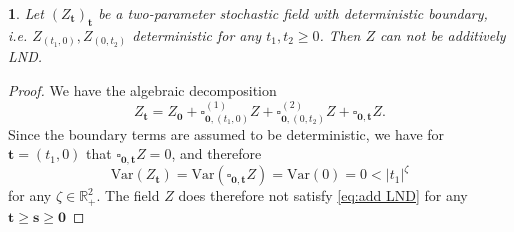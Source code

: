 \documentclass[11pt,oneside,english,reqno]{amsart}
\numberwithin{equation}{section}
\numberwithin{figure}{section}
\theoremstyle{plain}
\theoremstyle{definition}
\theoremstyle{remark}
\theoremstyle{plain}
\newtheorem{lem}[thm]{\protect\lemmaname}
\theoremstyle{plain}
\theoremstyle{plain}
\theoremstyle{plain}
\theoremstyle{plain}
\providecommand{\lemmaname}{Lemma}
\newcommand{\RR}{\mathbb{R}}
\newcommand{\boo}{\mathbf{0}}
\newcommand{\bs}{\mathbf{s}}
\newcommand{\bt}{\mathbf{t}}
\begin{document}
\begin{lem}
\label{no additive LND}
    Let $(Z_\bt)_\bt$ be a two-parameter stochastic field with deterministic boundary, i.e. $Z_{(t_1, 0)}, Z_{(0, t_2)}$ deterministic for any $t_1, t_2\geq0$. Then $Z$ can not be additively LND.
\end{lem}
\begin{proof}
    We have the algebraic decomposition
    \[
    Z_\bt=Z_\mathbf{0}+\square^{(1)}_{\boo, (t_1, 0)}Z+\square^{(2)}_{\boo, (0, t_2)}Z+\square_{\boo, \bt}Z.
    \]
    Since the boundary terms are assumed to be deterministic, we have for $\bt=(t_1, 0)$ that $\square_{\boo,\bt} Z =0$, and therefore  
    \[
    \mbox{Var}(Z_\bt)=\mbox{Var}(\square_{\boo, \bt}Z)=\mbox{Var}(0)=0<|t_1|^\zeta
    \]
    for any $\zeta\in \RR^2_+$. The field $Z$ does therefore not satisfy  \eqref{eq:add LND} for any $\bt\ge\bs\ge \mathbf{0}$
\end{proof}
\end{document}
